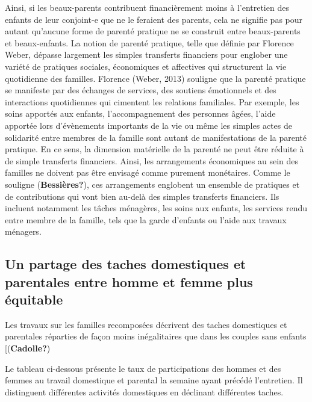 \documentclass[
  12pt,
]{book}
\begin{document}
Ainsi, si les beaux-parents contribuent financièrement moins à
l'entretien des enfants de leur conjoint-e que ne le feraient des
parents, cela ne signifie pas pour autant qu'aucune forme de parenté
pratique ne se construit entre beaux-parents et beaux-enfants. La notion
de parenté pratique, telle que définie par Florence Weber, dépasse
largement les simples transferts financiers pour englober une variété de
pratiques sociales, économiques et affectives qui structurent la vie
quotidienne des familles. Florence (Weber, 2013) souligne que la parenté
pratique se manifeste par des échanges de services, des soutiens
émotionnels et des interactions quotidiennes qui cimentent les relations
familiales. Par exemple, les soins apportés aux enfants,
l'accompagnement des personnes âgées, l'aide apportée lors d'évènements
importants de la vie ou même les simples actes de solidarité entre
membres de la famille sont autant de manifestations de la parenté
pratique. En ce sens, la dimension matérielle de la parenté ne peut être
réduite à de simple transferts financiers. Ainsi, les arrangements
économiques au sein des familles ne doivent pas être envisagé comme
purement monétaires. Comme le souligne (\textbf{Bessières?}), ces
arrangements englobent un ensemble de pratiques et de contributions qui
vont bien au-delà des simples transferts financiers. Ils incluent
notamment les tâches ménagères, les soins aux enfants, les services
rendu entre membre de la famille, tels que la garde d'enfants ou l'aide
aux travaux ménagers.

\subsection{Un partage des taches domestiques et parentales entre homme
et femme plus
équitable}\label{un-partage-des-taches-domestiques-et-parentales-entre-homme-et-femme-plus-uxe9quitable}

Les travaux sur les familles recomposées décrivent des taches
domestiques et parentales réparties de façon moins inégalitaires que
dans les couples sans enfants {[}(\textbf{Cadolle?})

Le tableau ci-dessous présente le taux de participations des hommes et
des femmes au travail domestique et parental la semaine ayant précédé
l'entretien. Il distinguent différentes activités domestiques en
déclinant différentes taches.
\end{document}
